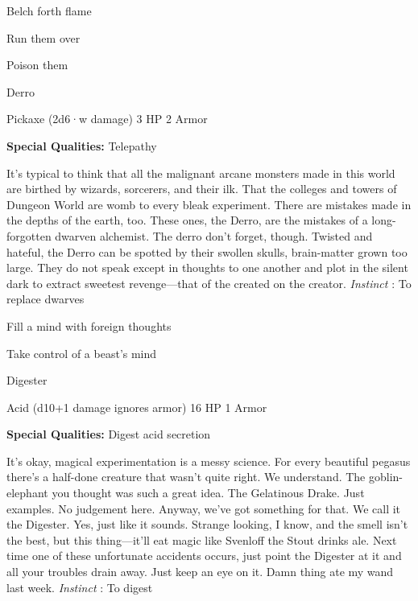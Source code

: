 \startitemize[1,packed]

\item Belch forth flame

 
\item Run them over

 
\item Poison them


\stopitemize
 
\startMonsterName
Derro	 
\stopMonsterName
 

Pickaxe (2d6·w damage)	3 HP	2 Armor

 


 
\startMonsterQualities
{\bf Special Qualities:}  Telepathy
\stopMonsterQualities
 
\startMonsterDescription
It’s typical to think that all the malignant arcane monsters made in this world are birthed by wizards, sorcerers, and their ilk. That the colleges and towers of Dungeon World are womb to every bleak experiment. There are mistakes made in the depths of the earth, too. These ones, the Derro, are the mistakes of a long-forgotten dwarven alchemist. The derro don’t forget, though. Twisted and hateful, the Derro can be spotted by their swollen skulls, brain-matter grown too large. They do not speak except in thoughts to one another and plot in the silent dark to extract sweetest revenge—that of the created on the creator. {\em Instinct} : To replace dwarves
\stopMonsterDescription
 
\startitemize[1,packed]

\item Fill a mind with foreign thoughts

 
\item Take control of a beast's mind


\stopitemize
 
\startMonsterName
Digester	 
\stopMonsterName
 

Acid (d10+1 damage ignores armor)	16 HP	1 Armor

 


 
\startMonsterQualities
{\bf Special Qualities:}  Digest acid secretion
\stopMonsterQualities
 
\startMonsterDescription
It’s okay, magical experimentation is a messy science. For every beautiful pegasus there’s a half-done creature that wasn’t quite right. We understand. The goblin-elephant you thought was such a great idea. The Gelatinous Drake. Just examples. No judgement here. Anyway, we’ve got something for that. We call it the Digester. Yes, just like it sounds. Strange looking, I know, and the smell isn’t the best, but this thing—it’ll eat magic like Svenloff the Stout drinks ale. Next time one of these unfortunate accidents occurs, just point the Digester at it and all your troubles drain away. Just keep an eye on it. Damn thing ate my wand last week. {\em Instinct} : To digest
\stopMonsterDescription
 
